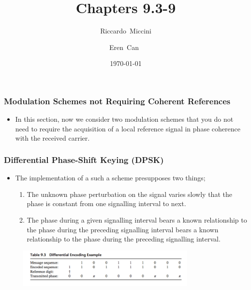 \documentclass{beamer}
\title{Chapters 9.3-9}
\subtitle{}
\author[Riccardo \and Eren]{Riccardo~Miccini\inst{1} \and Eren~Can~\inst{1}}
\institute[DTU]
{
	\inst{1}
	Technical University of Denmark\\
	Digital Communication
}
\date{\today}
\begin{document}
\frame{\titlepage}

\begin{frame}
	\frametitle{Modulation Schemes not Requiring Coherent References}
	\begin{itemize}
		\item In this section, now we consider two modulation schemes that you do not need to require the acquisition of  a local reference signal in phase coherence with the received carrier. 
	\end{itemize}
\end{frame}

\begin{frame}
	\frametitle{Differential Phase-Shift Keying  (DPSK)}
	\begin{itemize}
		\item The implementation of a such a scheme presupposes two things;
		\begin{enumerate}
		\item The unknown phase perturbation on the signal varies  slowly that the phase is constant from one signalling interval to next.
		\item  The phase during a given signalling interval bears a known relationship to the phase during the preceding signalling interval bears a known relationship to the phase during the preceding signalling interval.
	\end{enumerate}
	\end{itemize}
	\begin{figure}
	\includegraphics[width=0.8\textwidth]{9_3.png}
	\end{figure}
\end{frame}
\end{document}
